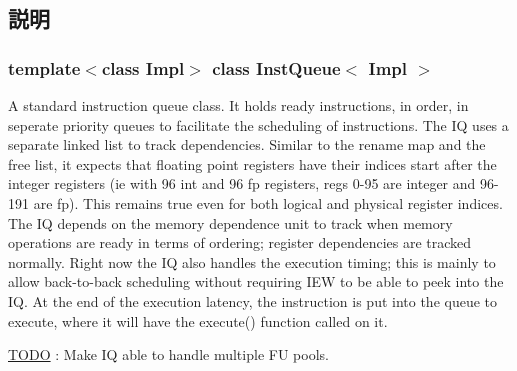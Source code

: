\subsection{説明}
\subsubsection*{template$<$class Impl$>$ class InstQueue$<$ Impl $>$}

A standard instruction queue class. It holds ready instructions, in order, in seperate priority queues to facilitate the scheduling of instructions. The IQ uses a separate linked list to track dependencies. Similar to the rename map and the free list, it expects that floating point registers have their indices start after the integer registers (ie with 96 int and 96 fp registers, regs 0-\/95 are integer and 96-\/191 are fp). This remains true even for both logical and physical register indices. The IQ depends on the memory dependence unit to track when memory operations are ready in terms of ordering; register dependencies are tracked normally. Right now the IQ also handles the execution timing; this is mainly to allow back-\/to-\/back scheduling without requiring IEW to be able to peek into the IQ. At the end of the execution latency, the instruction is put into the queue to execute, where it will have the execute() function called on it. \begin{Desc}
\item[\hyperlink{todo__todo000042}{TODO}]: Make IQ able to handle multiple FU pools. \end{Desc}


